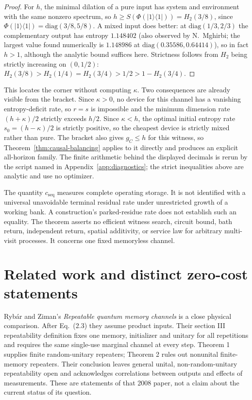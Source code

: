 \documentclass[11pt,a4paper]{article}
\numberwithin{equation}{section}
\theoremstyle{plain}
\theoremstyle{definition}
\newcommand{\cseq}{c_{\mathrm{seq}}}
\newcommand{\ketbra}[2]{\lvert #1 \rangle\langle #2 \rvert}
\begin{document}
\begin{proof}
For $h$, the minimal dilation of a pure input has system and environment with
the same nonzero spectrum, so $h\ge S(\Phi(\ketbra{1}{1}))=H_2(3/8)$, since
$\Phi(\ketbra{1}{1})=\mathrm{diag}(3/8,5/8)$. A mixed input does better: at
$\mathrm{diag}(1/3,2/3)$ the complementary output has entropy $1.148402$ (also
observed by N.~Mghirbi; the largest value found numerically is $1.148986$ at
$\mathrm{diag}(0.35586,0.64414)$), so in fact $h>1$, although the analytic
bound suffices here. Strictness follows from $H_2$
being strictly increasing on $(0,1/2)$:
$H_2(3/8)>H_2(1/4)=H_2(3/4)>1/2>1-H_2(3/4)$.
\end{proof}

This locates the corner without computing $\kappa$. Two consequences are
already visible from the bracket. Since $\kappa>0$, no device for this channel
has a vanishing entropy-deficit rate, so $r=s$ is impossible and the minimum
dimension rate $(h+\kappa)/2$ strictly exceeds $h/2$. Since $\kappa<h$, the
optimal initial entropy rate $s_0=(h-\kappa)/2$ is strictly positive, so the
cheapest device is strictly mixed rather than pure. The bracket also gives
$g_C\le h$ for this witness, so Theorem~\ref{thm:causal-balancing} applies to
it directly and produces an explicit all-horizon family. The finite arithmetic
behind the displayed decimals is rerun by the script named in
Appendix~\ref{app:diagnostics}; the strict inequalities above are analytic and
use no optimizer.

The quantity $\cseq$ measures complete operating storage. It is not identified
with a universal unavoidable terminal residual rate under unrestricted growth
of a working bank. A construction's parked-residue rate does not establish
such an equality. The theorem asserts no efficient witness search, circuit
bound, bath return, independent return, spatial additivity, or service law for
arbitrary multi-visit processes. It concerns one fixed memoryless channel.

\section{Related work and distinct zero-cost statements}
\label{sec:related}

Ryb\'ar and Ziman's \emph{Repeatable quantum memory channels}
\cite[sections II--IV]{RybarZiman2008} is a close physical comparison. After
Eq.~(2.3) they assume product inputs. Their section III repeatability
definition fixes one memory, initializer and unitary for all repetitions and
requires the same single-use marginal channel at every step. Theorem 1
supplies finite random-unitary repeaters; Theorem 2 rules out nonunital
finite-memory repeaters. Their conclusion leaves general unital,
non-random-unitary repeatability open and acknowledges correlations between
outputs and effects of measurements. These are statements of that 2008 paper,
not a claim about the current status of its question.
\end{document}
